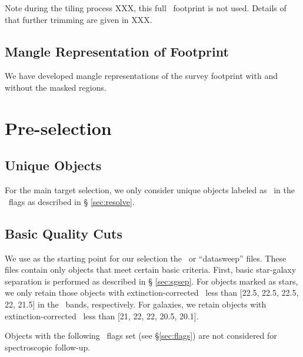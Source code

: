 \documentclass[12pt,preprint]{aastex}
\begin{document}
Note during the tiling process XXX, this full \boss\ footprint is not used.
Details of that further trimming are given in XXX.

\subsection{Mangle Representation of Footprint}

We have developed mangle \citep{SwansonMangle08} representations of
the survey footprint with and without the masked regions.


\section{Pre-selection}

\subsection{Unique Objects}

For the main target selection, we only consider unique objects labeled as
\surveyprimary\ in the \resolveflags\ flags as described in \S
\ref{sec:resolve}.

\subsection{Basic Quality Cuts} \label{sec:basiccuts}

We use as the starting point for our selection the \calibObj\ or ``datasweep''
files.   These files contain only objects that meet certain basic criteria.
First, basic star-galaxy separation is performed as described in \S
\ref{sec:sgsep}.  For objects marked as stars, we only retain those objects
with extinction-corrected \psfmag\ less than [22.5, 22.5, 22.5, 22, 21.5] in
the \allmag\ bands, respectively.  For galaxies, we retain objects with
extinction-corrected \modelmag\ less than [21, 22, 22, 20.5, 20.1].


Objects with the following \objflags\ flags set (see \S \ref{sec:flags}) are
not considered for spectroscopic follow-up.  
\end{document}
